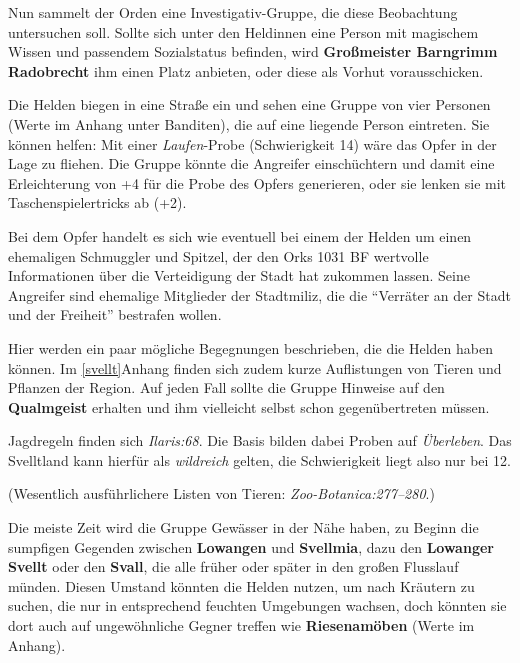 Nun sammelt der Orden eine Investigativ-Gruppe, die diese Beobachtung untersuchen soll.
Sollte sich unter den Heldinnen eine Person mit magischem Wissen und passendem Sozialstatus befinden, wird \textbf{Großmeister Barngrimm Radobrecht} ihm einen Platz anbieten, oder diese als Vorhut vorausschicken.


Die Helden biegen in eine Straße ein und sehen eine Gruppe von vier Personen (Werte im Anhang unter Banditen), die auf eine liegende Person eintreten.
Sie können helfen: Mit einer \emph{Laufen}-Probe (Schwierigkeit 14) wäre das Opfer in der Lage zu fliehen. Die Gruppe könnte die Angreifer einschüchtern und damit eine Erleichterung von +4 für die Probe des Opfers generieren, oder sie lenken sie mit Taschenspielertricks ab (+2).

Bei dem Opfer handelt es sich wie eventuell bei einem der Helden um einen ehemaligen Schmuggler und Spitzel, der den Orks 1031 BF wertvolle Informationen über die Verteidigung der Stadt hat zukommen lassen. Seine Angreifer sind ehemalige Mitglieder der Stadtmiliz, die die \enquote{Verräter an der Stadt und der Freiheit} bestrafen wollen.

\newpage

Hier werden ein paar mögliche Begegnungen beschrieben, die die Helden haben können. Im \ref{svellt}{Anhang} finden sich zudem kurze Auflistungen von Tieren und Pflanzen der Region. Auf jeden Fall sollte die Gruppe Hinweise auf den \textbf{Qualmgeist} erhalten und ihm vielleicht selbst schon gegenübertreten müssen.

Jagdregeln finden sich \emph{Ilaris:68}. Die Basis bilden dabei Proben auf \emph{Überleben}.
Das Svelltland kann hierfür als \emph{wildreich} gelten, die Schwierigkeit liegt also nur bei 12.

(Wesentlich ausführlichere Listen von Tieren: \emph{Zoo-Botanica:277--280}.)

Die meiste Zeit wird die Gruppe Gewässer in der Nähe haben, zu Beginn die sumpfigen Gegenden zwischen \textbf{Lowangen} und \textbf{Svellmia},
dazu den \textbf{Lowanger Svellt} oder den \textbf{Svall}, die alle früher oder später in den großen Flusslauf münden.
Diesen Umstand könnten die Helden nutzen, um nach Kräutern zu suchen, die nur in entsprechend feuchten Umgebungen wachsen, doch könnten sie dort auch auf ungewöhnliche Gegner treffen wie \textbf{Riesenamöben} (Werte im Anhang).

